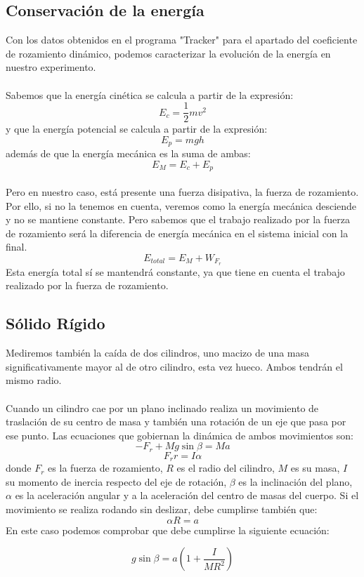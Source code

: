 \documentclass{article}
\begin{document}
\subsection{Conservación de la energía}
Con los datos obtenidos en el programa "Tracker" para el apartado del coeficiente de rozamiento dinámico, podemos caracterizar la evolución de la energía en nuestro experimento. \\\\
Sabemos que la energía cinética se calcula a partir de la expresión:
\[ E_c = \frac{1}{2} m v^2 \]
y que la energía potencial se calcula a partir de la expresión:
\[ E_p = m g h \]
además de que la energía mecánica es la suma de ambas:
\[ E_M = E_c + E_p \]
\\
Pero en nuestro caso, está presente una fuerza disipativa, la fuerza de rozamiento. Por ello, si no la tenemos en cuenta, veremos como la energía mecánica desciende y no se mantiene constante.
Pero sabemos que el trabajo realizado por la fuerza de rozamiento será la diferencia de energía mecánica en el sistema inicial con la final.\\
\[ E_{total} = E_M + W_{F_r} \]
Esta energía total sí se mantendrá constante, ya que tiene en cuenta el trabajo realizado por la fuerza de rozamiento.

\subsection{Sólido Rígido}
Mediremos también la caída de dos cilindros, uno macizo de una masa significativamente mayor al de otro cilindro, esta vez hueco. Ambos tendrán el mismo radio. \\\\ Cuando un cilindro cae por un plano inclinado realiza un movimiento de traslación de su centro de masa y también una rotación de un eje que pasa por ese punto. Las ecuaciones que gobiernan la dinámica de ambos movimientos son: 
\[ -F_r + M g \sin{\beta} = M a\]
\[ F_r r = I \alpha\]
donde $F_r$ es la fuerza de rozamiento, $R$ es el radio del cilindro, $M$ es su masa, $I$ su momento de inercia respecto del eje de rotación, $\beta$ es la inclinación del plano, $\alpha$ es la aceleración angular y a la aceleración del centro de masas del cuerpo. Si el movimiento se realiza rodando sin deslizar, debe cumplirse también que:
\[ \alpha R = a\]
En este caso podemos comprobar que debe cumplirse la siguiente ecuación:

\[ g \sin{\beta} = a \left( 1 + \frac{I}{M R^2} \right)\]
\end{document}

